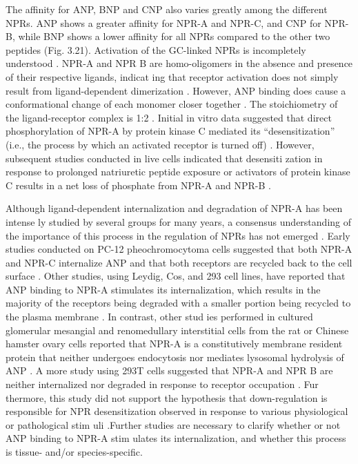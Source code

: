 \documentclass[14pt,a4paper,onecolumn]{extarticle}
\begin{document}
The affinity for ANP, BNP and CNP also varies greatly among the different NPRs.  ANP shows a greater affinity for NPR-A and NPR-C, and CNP for NPR-B, while BNP shows a lower affinity for all NPRs compared to the other two peptides (Fig. 3.21).  Activation of the GC-linked NPRs is incompletely understood \citep{172}. NPR-A and NPR B are homo-oligomers in the absence and presence of their respective ligands, indicat ing that receptor activation does not simply result from ligand-dependent dimerization \citep{173}. However, ANP binding does cause a conformational change of each monomer closer together \citep{172} \citep{173} \citep{174} \citep{175} \citep{176}. The stoichiometry of the ligand-receptor complex is 1:2 \citep{177}.  Initial in vitro data suggested that direct phosphorylation of NPR-A by protein kinase C mediated its “desensitization” (i.e., the process by which an activated receptor is turned off) \citep{178}. However, subsequent studies conducted in live cells indicated that desensiti zation in response to prolonged natriuretic peptide exposure or activators of protein kinase C results in a net loss of phosphate from NPR-A and NPR-B \citep{171} \citep{179} \citep{180} \citep{181} \citep{182}.

Although ligand-dependent internalization and degradation of NPR-A has been intense ly studied by several groups for many years, a consensus understanding of the importance of this process in the regulation of NPRs has not emerged \citep{182}. Early studies conducted on PC-12 pheochromocytoma cells suggested that both NPR-A and NPR-C internalize ANP and that both receptors are recycled back to the cell surface \citep{184}. Other studies, using Leydig, Cos, and 293 cell lines, have reported that ANP binding to NPR-A stimulates its internalization, which results in the majority of the receptors being degraded with a smaller portion being recycled to the plasma membrane \citep{184} \citep{185} \citep{186} \citep{187}. In contrast, other stud ies performed in cultured glomerular mesangial and renomedullary interstitial cells from the rat or Chinese hamster ovary cells reported that NPR-A is a constitutively membrane resident protein that neither undergoes endocytosis nor mediates lysosomal hydrolysis of ANP \citep{188} \citep{189}. A more  study using 293T cells suggested that NPR-A and NPR B are neither internalized nor degraded in response to receptor occupation \citep{173}. Fur thermore, this study did not support the hypothesis that down-regulation is responsible for NPR desensitization observed in response to various physiological or pathological stim uli \citep{182}.Further studies are necessary to clarify whether or not ANP binding to NPR-A stim ulates its internalization, and whether this process is tissue- and/or species-specific.
\end{document}
